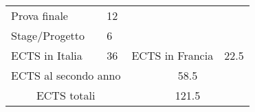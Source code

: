 \documentclass{article}
\begin{document}
\begin{figure}
\begin{adjustwidth}{-0.75cm}{}
\begin{tabular}{|m{5cm}|m{1cm}|m{5cm}|m{1cm}| }
            
            \hline
            
            Prova finale & \cellcolor{red!25}12 & \multicolumn{2}{c|}{ } \\
            Stage/Progetto & \cellcolor{red!25}6 & \multicolumn{2}{c|}{ } \\
            \hline
            
            ECTS in Italia & \cellcolor{red!45}36 & ECTS in Francia & \cellcolor{blue!45}22.5 \\
            \hline
            
            \multicolumn{2}{|c}{ ECTS al secondo anno} & \multicolumn{2}{c|}{58.5} \\
            \hline
            
            \multicolumn{2}{|c}{ECTS totali} & \multicolumn{2}{c|}{121.5} \\
            \hline
            
        \end{tabular}
    \end{adjustwidth}
\end{figure}
\end{document}
